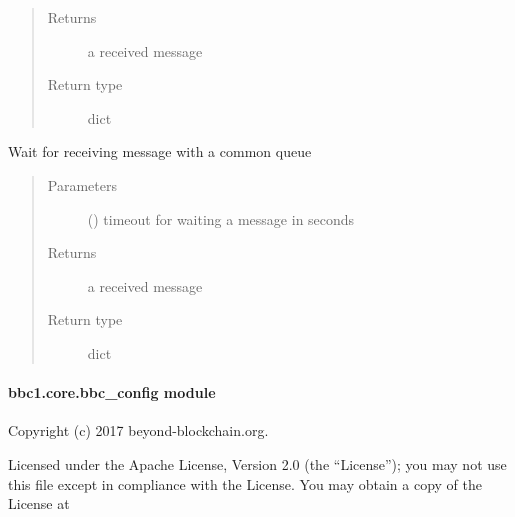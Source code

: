 \documentclass[letterpaper,10pt,english]{sphinxmanual}
\begin{document}
\begin{fulllineitems}
\begin{fulllineitems}
\begin{quote}
\begin{description}
\begin{itemize}
\end{itemize}

\item[{Returns}] \leavevmode
a received message

\item[{Return type}] \leavevmode
dict

\end{description}\end{quote}

\end{fulllineitems}


\begin{fulllineitems}
\label{\detokenize{bbc1.core.bbc_app:bbc1.core.bbc_app.Callback.synchronize}}
Wait for receiving message with a common queue
\begin{quote}\begin{description}
\item[{Parameters}] \leavevmode
{} () \textendash{} timeout for waiting a message in seconds

\item[{Returns}] \leavevmode
a received message

\item[{Return type}] \leavevmode
dict

\end{description}\end{quote}

\end{fulllineitems}


\end{fulllineitems}



\paragraph{bbc1.core.bbc\_config module}
\label{\detokenize{bbc1.core.bbc_config:module-bbc1.core.bbc_config}}\label{\detokenize{bbc1.core.bbc_config::doc}}\label{\detokenize{bbc1.core.bbc_config:bbc1-core-bbc-config-module}}
Copyright (c) 2017 beyond-blockchain.org.

Licensed under the Apache License, Version 2.0 (the “License”);
you may not use this file except in compliance with the License.
You may obtain a copy of the License at
\begin{quote}

\end{quote}
\end{document}
